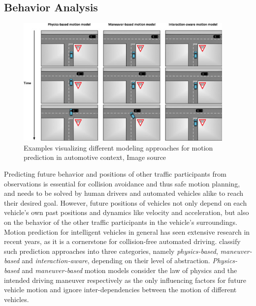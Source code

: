 \subsection{Behavior Analysis}
\label{subsec:behav_analysis}

\begin{figure}[t!]
	\centering
	\includegraphics[width=0.95\textwidth]{imgs/examples_motion_prediction_models.jpg}
	\caption{Examples visualizing different modeling approaches for motion prediction in automotive context, Image source \cite{Lefevre2014}}
	\label{fig:examples_motion_prediction_types}
\end{figure}
Predicting future behavior and positions of other traffic participants from observations is essential for collision avoidance and thus safe motion planning, and needs to be solved by human drivers and automated vehicles alike to reach their desired goal.
However, future positions of vehicles not only depend on each vehicle's own past positions and dynamics like  velocity and acceleration, but also on the behavior of the other traffic participants in the vehicle's surroundings.
Motion prediction for intelligent vehicles in general has seen extensive research in recent years, as it is a cornerstone for collision-free automated driving. \cite{Lefevre2014} classify such prediction approaches into three categories, namely \emph{physics-based}, \emph{maneuver-based} and \emph{interaction-aware}, depending on their level of abstraction.
\emph{Physics-based} and \emph{maneuver-based} motion models consider the law of physics and the intended driving maneuver respectively as the only influencing factors for future vehicle motion and ignore inter-dependencies between the motion of different vehicles.
